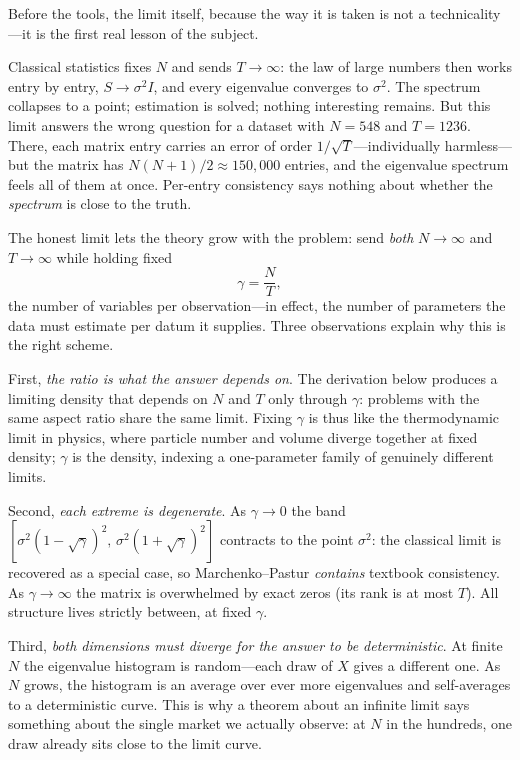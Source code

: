 \documentclass[11pt]{article}
\begin{document}
Before the tools, the limit itself, because the way it is taken is not a
technicality---it is the first real lesson of the subject.

Classical statistics fixes $N$ and sends $T\to\infty$: the law of large
numbers then works entry by entry, $S\to\sigma^{2}I$, and every eigenvalue
converges to $\sigma^{2}$. The spectrum collapses to a point; estimation is
solved; nothing interesting remains. But this limit answers the wrong
question for a dataset with $N=548$ and $T=1236$. There, each matrix entry
carries an error of order $1/\sqrt T$---individually harmless---but the
matrix has $N(N+1)/2\approx150{,}000$ entries, and the eigenvalue spectrum
feels all of them at once. Per-entry consistency says nothing about whether
the \emph{spectrum} is close to the truth.

The honest limit lets the theory grow with the problem: send \emph{both}
$N\to\infty$ and $T\to\infty$ while holding fixed
\begin{equation}
\gamma=\frac{N}{T},
\end{equation}
the number of variables per observation---in effect, the number of
parameters the data must estimate per datum it supplies. Three observations
explain why this is the right scheme.

First, \emph{the ratio is what the answer depends on}. The derivation below
produces a limiting density that depends on $N$ and $T$ only through
$\gamma$: problems with the same aspect ratio share the same limit. Fixing
$\gamma$ is thus like the thermodynamic limit in physics, where particle
number and volume diverge together at fixed density; $\gamma$ is the
density, indexing a one-parameter family of genuinely different limits.

Second, \emph{each extreme is degenerate}. As $\gamma\to0$ the band
$[\sigma^2(1-\sqrt\gamma)^2,\,\sigma^2(1+\sqrt\gamma)^2]$ contracts to the
point $\sigma^{2}$: the classical limit is recovered as a special case, so
Marchenko--Pastur \emph{contains} textbook consistency. As
$\gamma\to\infty$ the matrix is overwhelmed by exact zeros (its rank is at
most $T$). All structure lives strictly between, at fixed $\gamma$.

Third, \emph{both dimensions must diverge for the answer to be
deterministic}. At finite $N$ the eigenvalue histogram is random---each
draw of $X$ gives a different one. As $N$ grows, the histogram is an
average over ever more eigenvalues and self-averages to a deterministic
curve. This is why a theorem about an infinite limit says something about
the single market we actually observe: at $N$ in the hundreds, one draw
already sits close to the limit curve.
\end{document}
